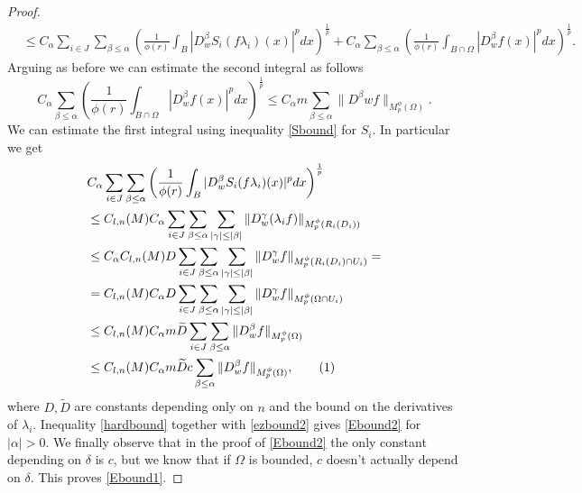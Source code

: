 \documentclass[12pt]{article}
\theoremstyle{definition}
\newcommand\addtag{\refstepcounter{equation}\tag{\theequation}}
\begin{document}
\begin{proof}
\begin{align*}
&\le C_\alpha\sum_{i\in J}\sum_{\beta\le \alpha}  \left( \frac{1}{\phi(r)} \int_B |D^\beta_wS_i(f\lambda_i)(x)|^pdx \right)^\frac{1}{p} +C_\alpha \sum_{\beta\le \alpha}  \left( \frac{1}{\phi(r)} \int_{B\cap\Omega} |D^\beta_w f(x)|^pdx \right)^\frac{1}{p}.
\end{align*}
Arguing as before we can estimate the second integral as follows
\begin{equation}
C_\alpha \sum_{\beta\le \alpha}  \left( \frac{1}{\phi(r)} \int_{B\cap\Omega} |D^\beta_w f(x)|^pdx \right)^\frac{1}{p}\le  C_\alpha m\sum_{\beta\le \alpha}  \| D^\beta wf\|_{M_p^\phi(\Omega)}. \label{ezbound2}
\end{equation}
We can estimate the first integral using inequality \eqref{Sbound} for $S_i$. In particular we get
\begin{align*}
&C_\alpha\sum_{i\in J}\sum_{\beta\le \alpha}  \left( \frac{1}{\phi(r)} \int_B |D^\beta_wS_i(f\lambda_i)(x)|^pdx \right)^\frac{1}{p} \\
& \le C_{l,n}(M) C_\alpha\sum_{i\in J}\sum_{\beta\le \alpha}\sum_{|\gamma|\le |\beta|} \| D^\gamma_w(\lambda_if)\|_{M_p^\phi(R_i(D_i))} \\
&\le C_\alpha C_{l,n}(M) D\sum_{i\in J}\sum_{\beta\le \alpha}\sum_{|\gamma|\le |\beta|} \| D^\gamma_wf\|_{M_p^\phi(R_i(D_i)\cap U_i)}= \\
&= C_{l,n}(M)C_\alpha D\sum_{i\in J}\sum_{\beta\le \alpha}\sum_{|\gamma|\le |\beta|} \| D^\gamma_wf\|_{M_p^\phi(\Omega\cap U_i)} \\
&\le C_{l,n}(M)C_\alpha m \widetilde D\sum_{i\in J} \sum_{\beta\le \alpha}\| D^\beta_wf\|_{M_p^\phi(\Omega)} \\
&\le C_{l,n}(M) C_\alpha m \widetilde Dc\sum_{\beta\le \alpha}\| D^\beta_wf\|_{M_p^\phi(\Omega)}, \addtag \label{hardbound}
\end{align*}
where $D,\widetilde D$ are constants depending only on $n$ and the bound on the derivatives of $\lambda_i.$ Inequality \eqref{hardbound} together with \eqref{ezbound2} gives \eqref{Ebound2} for $|\alpha|>0.$ We finally observe that in the proof of \eqref{Ebound2} the only constant depending on $\delta$ is $c$, but we know that if $\Omega$ is bounded, $c$ doesn't actually depend on $\delta$. This proves \eqref{Ebound1}.

\end{proof}


\end{document}
